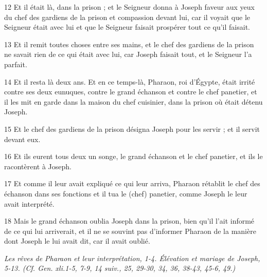 \par 12 Et il était là, dans la prison ; et le Seigneur donna à Joseph faveur aux yeux du chef des gardiens de la prison et compassion devant lui, car il voyait que le Seigneur était avec lui et que le Seigneur faisait prospérer tout ce qu'il faisait.
\par 13 Et il remit toutes choses entre ses mains, et le chef des gardiens de la prison ne savait rien de ce qui était avec lui, car Joseph faisait tout, et le Seigneur l'a parfait.
\par 14 Et il resta là deux ans. Et en ce temps-là, Pharaon, roi d'Égypte, était irrité contre ses deux eunuques, contre le grand échanson et contre le chef panetier, et il les mit en garde dans la maison du chef cuisinier, dans la prison où était détenu Joseph.
\par 15 Et le chef des gardiens de la prison désigna Joseph pour les servir ; et il servit devant eux.
\par 16 Et ils eurent tous deux un songe, le grand échanson et le chef panetier, et ils le racontèrent à Joseph.
\par 17 Et comme il leur avait expliqué ce qui leur arriva, Pharaon rétablit le chef des échanson dans ses fonctions et il tua le (chef) panetier, comme Joseph le leur avait interprété.
\par 18 Mais le grand échanson oublia Joseph dans la prison, bien qu'il l'ait informé de ce qui lui arriverait, et il ne se souvint pas d'informer Pharaon de la manière dont Joseph le lui avait dit, car il avait oublié.


\par \textit{Les rêves de Pharaon et leur interprétation, 1-4. Élévation et mariage de Joseph, 5-13. (Cf. Gen. xli.1-5, 7-9, 14 suiv., 25, 29-30, 34, 36, 38-43, 45-6, 49.)}

